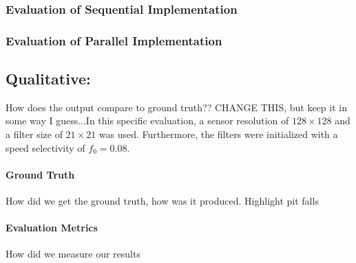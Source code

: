 \subsubsection{Evaluation of Sequential Implementation}
\subsubsection{Evaluation of Parallel Implementation}

\subsection{Qualitative:} How does the output compare to ground truth??
CHANGE THIS, but keep it in some way I guess...In this specific evaluation, a sensor resolution of $128\times128$ and a filter size of $21\times21$ was used.
Furthermore, the filters were initialized with a speed selectivity of $f_0=0.08$.
\paragraph{Ground Truth}
How did we get the ground truth, how was it produced. Highlight pit falls
\paragraph{Evaluation Metrics}
How did we measure our results
